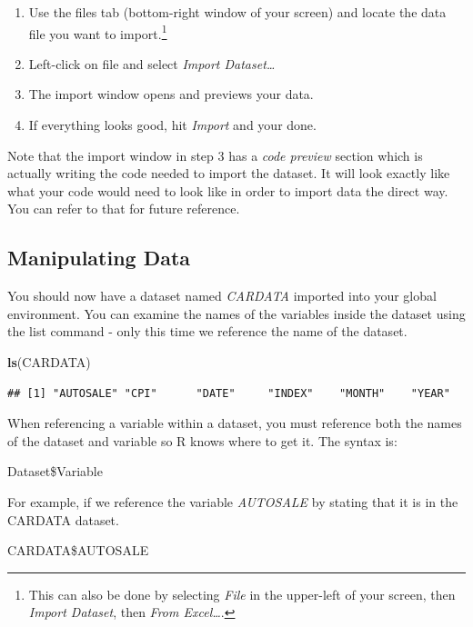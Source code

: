 \documentclass[
]{book}
\newenvironment{Shaded}{\begin{snugshade}}{\end{snugshade}}
\newcommand{\FunctionTok}[1]{\textcolor[rgb]{0.13,0.29,0.53}{\textbf{#1}}}
\newcommand{\NormalTok}[1]{#1}
\begin{document}
\begin{enumerate}
\def\labelenumi{\arabic{enumi}.}
\item
  Use the files tab (bottom-right window of your screen) and locate the data file you want to import.\footnote{This can also be done by selecting \emph{File} in the upper-left of your screen, then \emph{Import Dataset}, then \emph{From Excel\ldots{}}.}
\item
  Left-click on file and select \emph{Import Dataset\ldots{}}
\item
  The import window opens and previews your data.
\item
  If everything looks good, hit \emph{Import} and your done.
\end{enumerate}

Note that the import window in step 3 has a \emph{code preview} section which is actually writing the code needed to import the dataset. It will look exactly like what your code would need to look like in order to import data the direct way. You can refer to that for future reference.

\subsection{Manipulating Data}\label{manipulating-data}

You should now have a dataset named \emph{CARDATA} imported into your global environment. You can examine the names of the variables inside the dataset using the list command - only this time we reference the name of the dataset.

\begin{Shaded}
\begin{Highlighting}[]
\FunctionTok{ls}\NormalTok{(CARDATA)}
\end{Highlighting}
\end{Shaded}

\begin{verbatim}
## [1] "AUTOSALE" "CPI"      "DATE"     "INDEX"    "MONTH"    "YEAR"
\end{verbatim}

When referencing a variable within a dataset, you must reference both the names of the dataset and variable so R knows where to get it. The syntax is:

Dataset\$Variable

For example, if we reference the variable \emph{AUTOSALE} by stating that it is in the CARDATA dataset.

CARDATA\$AUTOSALE
\end{document}

